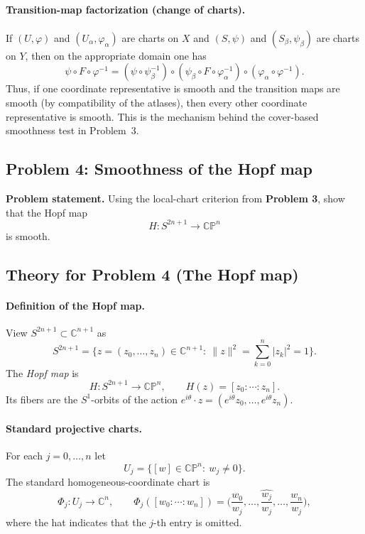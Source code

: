 \documentclass[12pt,a4paper]{article}
\theoremstyle{plain}
\theoremstyle{definition}      %
\begin{document}
\paragraph{Transition-map factorization (change of charts).}
If $(U,\varphi)$ and $(U_{\alpha},\varphi_{\alpha})$ are charts on $X$ and
$(S,\psi)$ and $(S_{\beta},\psi_{\beta})$ are charts on $Y$, then on the appropriate domain one has
\[
\psi\circ F\circ \varphi^{-1}
=
(\psi\circ \psi_{\beta}^{-1})
\circ
(\psi_{\beta}\circ F\circ \varphi_{\alpha}^{-1})
\circ
(\varphi_{\alpha}\circ \varphi^{-1}).
\]
Thus, if one coordinate representative is smooth and the transition maps are smooth
(by compatibility of the atlases), then every other coordinate representative is smooth.
This is the mechanism behind the cover-based smoothness test in Problem~3.


\subsection*{Problem 4: Smoothness of the Hopf map}

\noindent\textbf{Problem statement.}
Using the local-chart criterion from \textbf{Problem 3}, show that the Hopf map
\[
H:S^{2n+1}\longrightarrow \mathbb{CP}^n
\]
is smooth.


\subsection*{Theory for Problem 4 (The Hopf map)}

\paragraph{Definition of the Hopf map.}
View $S^{2n+1}\subset\mathbb C^{n+1}$ as
\[
S^{2n+1}=\Big\{z=(z_0,\dots,z_n)\in\mathbb C^{n+1}:\ \|z\|^2=\sum_{k=0}^n |z_k|^2=1\Big\}.
\]
The \emph{Hopf map} is
\[
H:S^{2n+1}\longrightarrow \mathbb{CP}^n,
\qquad
H(z)=[z_0:\cdots:z_n].
\]
Its fibers are the $S^1$-orbits of the action $e^{i\theta}\cdot z=(e^{i\theta}z_0,\dots,e^{i\theta}z_n)$.

\paragraph{Standard projective charts.}
For each $j=0,\dots,n$ let
\[
U_j=\{[w]\in\mathbb{CP}^n:\ w_j\neq 0\}.
\]
The standard homogeneous-coordinate chart is
\[
\Phi_j:U_j\to \mathbb C^n,\qquad
\Phi_j([w_0:\cdots:w_n])=
\Big(\frac{w_0}{w_j},\dots,\widehat{\frac{w_j}{w_j}},\dots,\frac{w_n}{w_j}\Big),
\]
where the hat indicates that the $j$-th entry is omitted.
\end{document}
